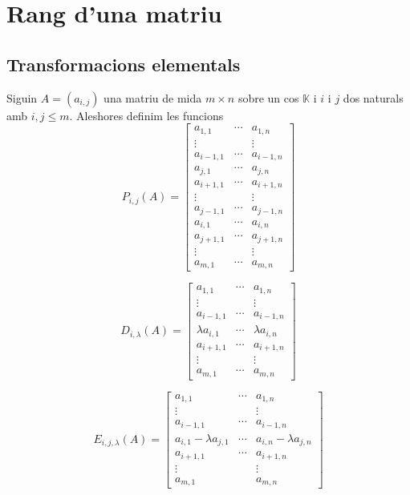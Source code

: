 \documentclass[../Apunts.tex]{subfiles}
\begin{document}
	\section{Rang d'una matriu}
	\subsection{Transformacions elementals}
	\begin{definition} %
		\label{def:transformacions elementals}
		Siguin \(A=(a_{i,j})\) una matriu de mida \(m\times n\) sobre un cos \(\mathbb{K}\) i \(i\) i \(j\) dos naturals amb \(i,j\leq m\). Aleshores definim les funcions
		\[P_{i,j}(A)=\left[\begin{matrix}
		a_{1,1} & \cdots & a_{1,n} \\
		\vdots & & \vdots \\
		a_{i-1,1} & \cdots & a_{i-1,n} \\
		a_{j,1} & \cdots & a_{j,n} \\
		a_{i+1,1} & \cdots & a_{i+1,n} \\
		\vdots & & \vdots \\
		a_{j-1,1} & \cdots & a_{j-1,n} \\
		a_{i,1} & \cdots & a_{i,n} \\
		a_{j+1,1} & \cdots & a_{j+1,n} \\
		\vdots & & \vdots \\
		a_{m,1} & \cdots & a_{m,n}
		\end{matrix}\right]\]
		
		\[D_{i,\lambda}(A)=\left[\begin{matrix}
		a_{1,1} & \cdots & a_{1,n} \\
		\vdots & & \vdots \\
		a_{i-1,1} & \cdots & a_{i-1,n} \\
		\lambda a_{i,1} & \cdots & \lambda a_{i,n} \\
		a_{i+1,1} & \cdots & a_{i+1,n} \\
		\vdots & & \vdots \\
		a_{m,1} & \cdots & a_{m,n}
		\end{matrix}\right]\]
		
		\[E_{i,j,\lambda}(A)=\left[\begin{matrix}
		a_{1,1} & \cdots & a_{1,n} \\
		\vdots & & \vdots \\
		a_{i-1,1} & \cdots & a_{i-1,n} \\
		a_{i,1}-\lambda a_{j,1} & \cdots & a_{i,n}-\lambda a_{j,n}\\
		a_{i+1,1} & \cdots & a_{i+1,n} \\
		\vdots & & \vdots \\
		a_{m,1} & & a_{m,n}
		\end{matrix}\right]\]
	\end{definition}
\end{document}
